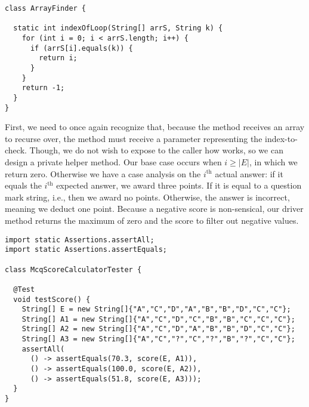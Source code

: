 \begin{lstlisting}[language=MyJava]
class ArrayFinder {
  
  static int indexOfLoop(String[] arrS, String k) {
    for (int i = 0; i < arrS.length; i++) {
      if (arrS[i].equals(k)) { 
        return i; 
      }
    }
    return -1;
  }
}
\end{lstlisting}


First, we need to once again recognize that, because the method receives an array to recurse over, the method must receive a parameter representing the index-to-check. Though, we do not wish to expose to the caller how  works, so we can design a private helper method. Our base case occurs when $i \geq |E|$, in which we return zero. Otherwise we have a case analysis on the $i^\text{th}$ actual answer: if it equals the $i^\text{th}$ expected answer, we award three points. If it is equal to a question mark string, i.e.,  then we award no points. Otherwise, the answer is incorrect, meaning we deduct one point. Because a negative score is non-sensical, our driver method returns the maximum of zero and the score to filter out negative values.

\begin{lstlisting}[language=MyJava]
import static Assertions.assertAll;
import static Assertions.assertEquals;

class McqScoreCalculatorTester {

  @Test
  void testScore() {    
    String[] E = new String[]{"A","C","D","A","B","B","D","C","C"};
    String[] A1 = new String[]{"A","C","D","C","B","B","C","C","C"};
    String[] A2 = new String[]{"A","C","D","A","B","B","D","C","C"};
    String[] A3 = new String[]{"A","C","?","C","?","B","?","C","C"};
    assertAll(
      () -> assertEquals(70.3, score(E, A1)),
      () -> assertEquals(100.0, score(E, A2)),
      () -> assertEquals(51.8, score(E, A3)));
  }
}
\end{lstlisting}


